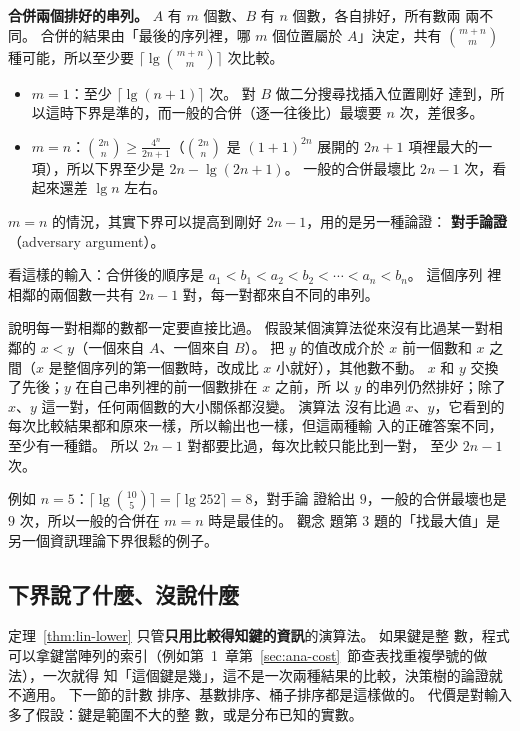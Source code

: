 \textbf{合併兩個排好的串列。} $A$ 有 $m$ 個數、$B$ 有 $n$ 個數，各自排好，所有數兩
兩不同。 合併的結果由「最後的序列裡，哪 $m$ 個位置屬於 $A$」決定，共有
$\binom{m+n}{m}$ 種可能，所以至少要 $\lceil \lg \binom{m+n}{m} \rceil$ 次比較。
\begin{itemize}
\item $m = 1$：至少 $\lceil \lg(n+1) \rceil$ 次。 對 $B$ 做二分搜尋找插入位置剛好
達到，所以這時下界是準的，而一般的合併（逐一往後比）最壞要 $n$ 次，差很多。
\item $m = n$：$\binom{2n}{n} \ge \frac{4^n}{2n+1}$（$\binom{2n}{n}$ 是
$(1+1)^{2n}$ 展開的 $2n+1$ 項裡最大的一項），所以下界至少是
$2n - \lg(2n+1)$。 一般的合併最壞比 $2n - 1$ 次，看起來還差 $\lg n$ 左右。
\end{itemize}

$m = n$ 的情況，其實下界可以提高到剛好 $2n - 1$，用的是另一種論證：
\textbf{對手論證}（adversary argument）。

\begin{whybox}
看這樣的輸入：合併後的順序是 $a_1 < b_1 < a_2 < b_2 < \cdots < a_n < b_n$。 這個序列
裡相鄰的兩個數一共有 $2n - 1$ 對，每一對都來自不同的串列。

說明每一對相鄰的數都一定要直接比過。 假設某個演算法從來沒有比過某一對相鄰的
$x < y$（一個來自 $A$、一個來自 $B$）。 把 $y$ 的值改成介於 $x$ 前一個數和 $x$ 之
間（$x$ 是整個序列的第一個數時，改成比 $x$ 小就好），其他數不動。 $x$ 和 $y$ 交換了先後；$y$ 在自己串列裡的前一個數排在 $x$ 之前，所
以 $y$ 的串列仍然排好；除了 $x$、$y$ 這一對，任何兩個數的大小關係都沒變。 演算法
沒有比過 $x$、$y$，它看到的每次比較結果都和原來一樣，所以輸出也一樣，但這兩種輸
入的正確答案不同，至少有一種錯。 所以 $2n - 1$ 對都要比過，每次比較只能比到一對，
至少 $2n - 1$ 次。
\end{whybox}

例如 $n = 5$：$\lceil \lg \binom{10}{5} \rceil = \lceil \lg 252 \rceil = 8$，對手論
證給出 $9$，一般的合併最壞也是 $9$ 次，所以一般的合併在 $m = n$ 時是最佳的。 觀念
題第 3 題的「找最大值」是另一個資訊理論下界很鬆的例子。


\subsection{下界說了什麼、沒說什麼}

定理~\ref{thm:lin-lower} 只管\textbf{只用比較得知鍵的資訊}的演算法。 如果鍵是整
數，程式可以拿鍵當陣列的索引（例如第~1~章第~\ref{sec:ana-cost}~節查表找重複學號的做法），一次就得
知「這個鍵是幾」，這不是一次兩種結果的比較，決策樹的論證就不適用。 下一節的計數
排序、基數排序、桶子排序都是這樣做的。 代價是對輸入多了假設：鍵是範圍不大的整
數，或是分布已知的實數。

